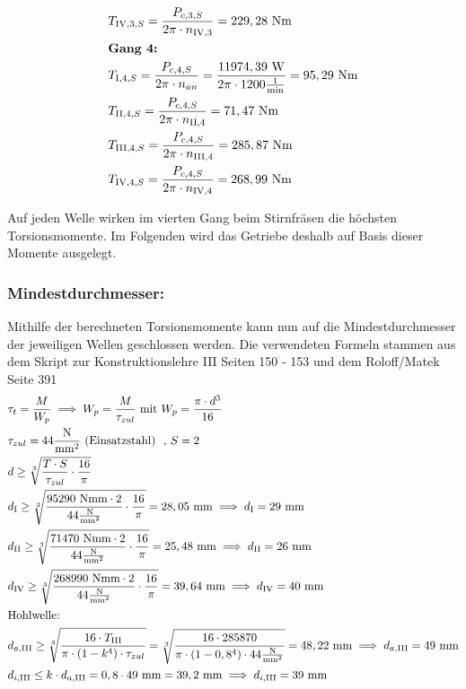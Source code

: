 \begin{itemize}
\begin{align*}
	&T_{\mathord{\mathrm{IV}},3,S} = \frac{P_{c,3,S}}{2 \pi \cdot n_{\mathord{\mathrm{IV}},3}} = 229,28 \text{ Nm} \\
	&\textbf{Gang 4: } \\
	&T_{\mathord{\mathrm{I}},4,S} = \frac{P_{c,4,S}}{2 \pi \cdot n_{an}} = \frac{11974,39 \text{ W} }{2 \pi \cdot 1200 \frac{1}{\text{min}}} =95,29 \text{ Nm} \\
	&T_{\mathord{\mathrm{II}},4,S} = \frac{P_{c,4,S}}{2 \pi \cdot n_{\mathord{\mathrm{II}},4}} =71,47\text{ Nm} \\
	&T_{\mathord{\mathrm{III}},4,S} = \frac{P_{c,4,S}}{2 \pi \cdot n_{\mathord{\mathrm{III}},4}} = 285,87 \text{ Nm} \\
	&T_{\mathord{\mathrm{IV}},4,S} = \frac{P_{c,4,S}}{2 \pi \cdot n_{\mathord{\mathrm{IV}},4}} =268,99 \text{ Nm} \\
\end{align*}	
\end{itemize}
Auf jeden Welle wirken im vierten Gang beim Stirnfräsen die höchsten Torsionsmomente. Im Folgenden wird das Getriebe deshalb auf Basis dieser Momente ausgelegt.
\newpage
\subsubsection{Mindestdurchmesser:}
Mithilfe der berechneten Torsionsmomente kann nun auf die Mindestdurchmesser der jeweiligen Wellen geschlossen werden. Die verwendeten Formeln stammen aus dem Skript zur Konstruktionslehre III Seiten 150 - 153 und dem Roloff/Matek Seite 391
\begin{align*}
	&\tau_t = \frac{M}{W_p} \implies W_p = \frac{M}{\tau_{zul}} \text{ mit } W_p = \frac{\pi\cdot d^3}{16} \\
	&\tau_{zul} = 44 \frac{\text{N}}{\text{mm}^2} \text{ (Einsatzstahl) } \text{ , } S= 2 \\
	&d \ge \sqrt[3]{ \frac{T \cdot S}{\tau_{zul}} \cdot \frac{16}{\pi}}  \\
	&d_\mathrm{I} \ge \sqrt[3]{ \frac{95290\text{ Nmm} \cdot 2}{44\frac{\text{N}}{\text{mm}^2}} \cdot \frac{16}{\pi}} = 28,05\text{ mm} \implies d_\mathrm{I} = 29\text{ mm} \\
	&d_\mathrm{II} \ge \sqrt[3]{ \frac{71470\text{ Nmm} \cdot 2}{44\frac{\text{N}}{\text{mm}^2}} \cdot \frac{16}{\pi}} = 25,48\text{ mm} \implies d_\mathrm{II} = 26\text{ mm} \\
	&d_\mathrm{IV} \ge \sqrt[3]{ \frac{268990\text{ Nmm} \cdot 2}{44\frac{\text{N}}{\text{mm}^2}} \cdot \frac{16}{\pi}} = 39,64\text{ mm} \implies d_\mathrm{IV} = 40\text{ mm} \\
	&\text{Hohlwelle: } \\
	&d_{a,\mathrm{III}} \ge \sqrt[3]{ \frac{16 \cdot T_{\mathrm{III}}}{\pi \cdot (1-k^4) \cdot \tau_{zul}}} = \sqrt[3]{ \frac{16 \cdot 285870}{\pi \cdot (1-0,8^4) \cdot 44 \frac{\text{N}}{\text{mm}^2} }} = 48,22\text{ mm} \implies d_{a,\mathrm{III}} = 49\text{ mm} \\
	&d_{i,\mathrm{III}} \le k \cdot d_{a,\mathrm{III}} = 0,8 \cdot 49 \text{ mm} = 39,2 \text{ mm} \implies d_{i,\mathrm{III}} = 39\text{ mm} \\
\end{align*}
\newpage

